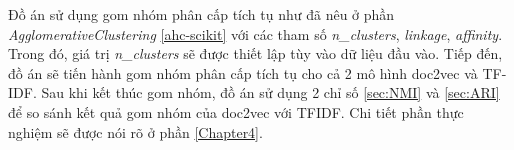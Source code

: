 Đồ án sử dụng gom nhóm phân cấp tích tụ như đã nêu ở phần \textit{AgglomerativeClustering} \ref{ahc-scikit} với các tham số {\textit{n{\_}clusters}, \textit{linkage}, \textit{affinity}}.
Trong đó, giá trị \textit{n{\_}clusters} sẽ được thiết lập tùy vào dữ liệu đầu vào.
Tiếp đến, đồ án sẽ tiến hành gom nhóm phân cấp tích tụ cho cả 2 mô hình doc2vec và TF-IDF.
Sau khi kết thúc gom nhóm, đồ án sử dụng 2 chỉ số \ref{sec:NMI} và \ref{sec:ARI} để so sánh kết quả gom nhóm của doc2vec với TFIDF.
Chi tiết phần thực nghiệm sẽ được nói rõ ở phần \ref{Chapter4}.
%
%
%
%

